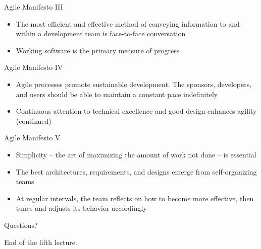 \documentclass{beamer}
\begin{document}
\begin{frame}{\centerline{Agile Manifesto III}}
\begin{itemize}
\item  The most efficient and effective method of conveying information to and within a development team is face-to-face conversation

\item  Working software is the primary measure of progress

\end{itemize}
\end{frame}

\begin{frame}{\centerline{Agile Manifesto IV}}
\begin{itemize}
\item  Agile processes promote sustainable development. The sponsors, developers, and users should be able to maintain a constant pace indefinitely

\item  Continuous attention to technical excellence and good design enhances agility
(continued)
\end{itemize}
\end{frame}

\begin{frame}{\centerline{Agile Manifesto V}}
\begin{itemize}
\item  Simplicity -- the art of maximizing the amount of work not done -- is essential

\item  The best architectures, requirements, and designs emerge from self-organizing teams

\item  At regular intervals, the team reflects on how to become more effective, then tunes and adjusts its behavior accordingly
\end{itemize}
\end{frame}




\begin{frame}
{\centerline{Questions?}}
\vspace{1cm}
\begin{center}
    \LARGE{End of the fifth lecture.}
\end{center}

\end{frame}
\end{document}
